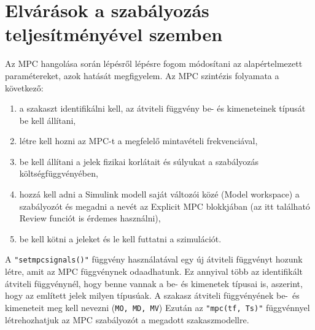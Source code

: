 \section{Elvárások a szabályozás teljesítményével szemben}

Az MPC hangolása során %
lépésről lépésre fogom módosítani az alapértelmezett paramétereket, azok hatását megfigyelem.
Az MPC szintézis folyamata a következő:%


\begin{enumerate}[noitemsep,topsep=0pt,parsep=2pt,partopsep=4pt,leftmargin=30pt]
	\item a szakaszt identifikálni kell, az átviteli függvény be- és kimeneteinek típusát be kell állítani,
	\item létre kell hozni az MPC-t a megfelelő mintavételi frekvenciával,
	\item be kell állítani a jelek fizikai korlátait és súlyukat a szabályozás költségfüggvényében,
	\item hozzá kell adni a Simulink modell saját változói közé (Model workspace) a szabályozót és megadni a nevét az Explicit MPC blokkjában (az itt található Review funciót is érdemes használni),
	\item be kell kötni a jeleket és le kell futtatni a szimulációt.
	
\end{enumerate}


A \verb|"setmpcsignals()"| függvény használatával egy új átviteli függvényt hozunk létre, amit az MPC függvénynek odaadhatunk. Ez annyival több az identifikált átviteli függvénynél, hogy benne vannak a be- és kimenetek típusai is, aszerint, hogy az említett jelek milyen típusúak. A szakasz átviteli függvényének be-~és kimeneteit meg kell nevezni (\verb|MO, MD, MV|) Ezután az \verb|"mpc(tf, Ts)"| függvénnyel létrehozhatjuk az MPC szabályozót a megadott szakaszmodellre.



%
%
%
%
%



